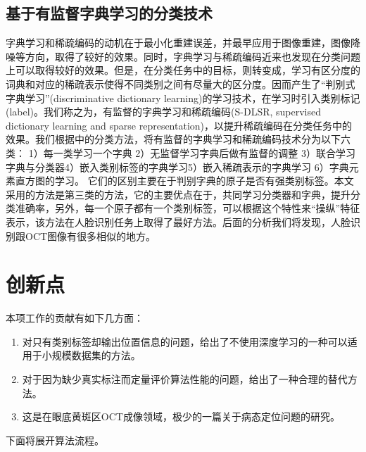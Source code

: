     \subsection{基于有监督字典学习的分类技术}
    字典学习和稀疏编码的动机在于最小化重建误差，并最早应用于图像重建，图像降噪等方向，取得了较好的效果。同时，字典学习与稀疏编码近来也发现在分类问题上可以取得较好的效果。但是，在分类任务中的目标，则转变成，学习有区分度的词典和对应的稀疏表示使得不同类别之间有尽量大的区分度。因而产生了“判别式字典学习”(discriminative dictionary learning)的学习技术，在学习时引入类别标记(label)。我们称之为，有监督的字典学习和稀疏编码(S-DLSR, supervised dictionary learning and sparse representation)，以提升稀疏编码在分类任务中的效果。我们根据中的分类方法，将有监督的字典学习和稀疏编码技术分为以下六类： 1）每一类学习一个字典\cite{wright2009robust,yang2010metaface} 2）无监督学习字典后做有监督的调整\cite{fulkerson2008localizing,winn2005object} 3）联合学习字典与分类器\cite{mairal2008discriminative,jiang2013label,zhang2010discriminative,pham2008joint,yang2008unifying}4）嵌入类别标签的字典学习5）嵌入稀疏表示的字典学习\cite{huang2006sparse,yang2011fisher,rodriguez2008sparse} \cite{gangeh2013kernelized,zhang2013simultaneous,lazebnik2009supervised}6）字典元素直方图的学习。\cite{lian2010probabilistic,zhang2009learning}
    它们的区别主要在于判别字典的原子是否有强类别标签。本文采用的方法是第三类\cite{jiang2013label}的方法，它的主要优点在于，共同学习分类器和字典，提升分类准确率，另外，每一个原子都有一个类别标签，可以根据这个特性来“操纵”特征表示，该方法在人脸识别任务上取得了最好方法。后面的分析我们将发现，人脸识别跟OCT图像有很多相似的地方。

\section{创新点}
    本项工作的贡献有如下几方面：
    \begin{enumerate}
        \item 对只有类别标签却输出位置信息的问题，给出了不使用深度学习的一种可以适用于小规模数据集的方法。
        \item 对于因为缺少真实标注而定量评价算法性能的问题，给出了一种合理的替代方法。
        \item 这是在眼底黄斑区OCT成像领域，极少的一篇关于病态定位问题的研究。
    \end{enumerate}

    下面将展开算法流程。